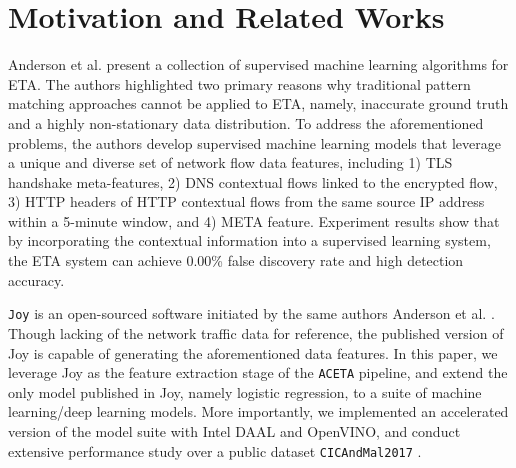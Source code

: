 \section{Motivation and Related Works}
\label{sec:related}

Anderson et al. \cite{Anderson:2016, Anderson:2017} present a collection of supervised machine learning algorithms for ETA. The authors highlighted two primary reasons why traditional pattern matching approaches cannot be applied to ETA, namely, inaccurate ground truth and a highly non-stationary data distribution. To address the aforementioned problems, the authors develop supervised machine learning models that leverage a unique and diverse set of network flow data features, including 1) TLS handshake meta-features, 2) DNS contextual flows linked to the encrypted flow, 3) HTTP headers of HTTP contextual flows from the same source IP address within a 5-minute window, and 4) META feature. Experiment results show that by incorporating the contextual information into a supervised learning system, the ETA system can achieve 0.00\% false discovery rate and high detection accuracy. 

\texttt{Joy} \cite{joy} is an open-sourced software initiated by the same authors Anderson et al. \cite{Anderson:2016, Anderson:2017}. Though lacking of the network traffic data for reference, the published version of Joy is capable of generating the aforementioned data features. In this paper, we leverage Joy as the feature extraction stage of the \texttt{ACETA} pipeline, and extend the only model published in Joy, namely logistic regression, to a suite of machine learning/deep learning models. More importantly, we implemented an accelerated version of the model suite with Intel DAAL and OpenVINO, and conduct extensive performance study over a public dataset \texttt{CICAndMal2017} \cite{cicandmal2017}.